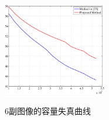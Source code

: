 \begin{figure}[!ht]
{    \includegraphics[width=0.4\textwidth]{figures/k1_results.eps}
    \label{fig:lena_results}}
  \\
  \caption{6副图像的容量失真曲线}
  \label{fig:6_image_results}
\end{figure}
